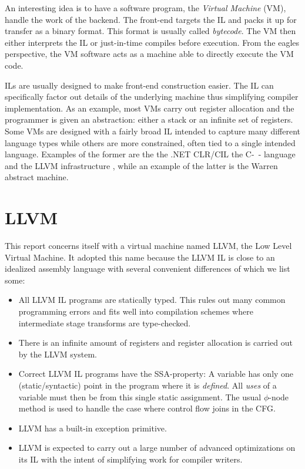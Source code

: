 \documentclass[a4paper, oneside, 10pt, draft]{memoir}
\begin{document}
An interesting idea is to have a software program, the \emph{Virtual
  Machine} (VM), handle the work of the backend. The front-end
targets the IL and packs it up for transfer as a binary format. This
format is usually called \emph{bytecode}. The VM then either
interprets the IL or just-in-time compiles before execution. From the
eagles perspective, the VM software acts as a machine able to directly
execute the VM code.

ILs are usually designed to make front-end construction easier. The IL
can specifically factor out details of the underlying machine thus
simplifying compiler implementation. As an example, most VMs carry out
register allocation and the programmer is given an abstraction: either
a stack or an infinite set of registers. Some VMs are designed with a
fairly broad IL intended to capture many different language types
while others are more constrained, often tied to a single intended
language. Examples of the former are the the .NET
CLR/CIL\cite{ecma:2006:335} the C-\ - language\cite{http:cminmin} and
the LLVM infrastructure \cite{lattner.ea:2009:llvm-ref}, while an
example of the latter is the Warren abstract
machine\cite{warren:1983:prolog}.

\section{LLVM}

This report concerns itself with a virtual machine named LLVM, the Low
Level Virtual Machine. It adopted this name because the LLVM IL is
close to an idealized assembly language with several convenient
differences of which we list some:
\begin{itemize}
\item All LLVM IL programs are statically typed. This rules out many
  common programming errors and fits well into compilation schemes
  where intermediate stage transforms are type-checked.
\item There is an infinite amount of registers and register allocation
  is carried out by the LLVM system.
\item Correct LLVM IL programs have the SSA-property: A variable has
  only one (static/syntactic) point in the program where it is
  \emph{defined}. All \emph{uses} of a variable must then be from this
  single static assignment. The usual $\phi$-node method is used to
  handle the case where control flow joins in the CFG.
\item LLVM has a built-in exception primitive.
\item LLVM is expected to carry out a large number of advanced
  optimizations on its IL with the intent of simplifying work for
  compiler writers.
\end{itemize}
\end{document}
